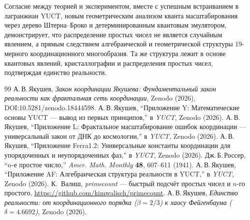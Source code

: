 \documentclass[12pt,a4paper]{article}
\begin{document}
	Согласие между теорией и экспериментом, вместе с успешным встраиванием в лагранжиан YUCT, новым геометрическим анализом кванта масштабирования через дерево Штерна–Броко и детерминированным квантовым эмулятором, демонстрирует, что распределение простых чисел не является случайным явлением, а прямым следствием алгебраической и геометрической структуры 19-мерного координационного многообразия. Та же структура лежит в основе квантовых явлений, кристаллографии и распределения простых чисел, подтверждая единство реальности.
	
	\begin{thebibliography}{99}
		А.\,В.\,Якушев, \emph{Закон координации Якушева: Фундаментальный закон реальности как фрактальная сеть координации}, Zenodo (2026), DOI:10.5281/zenodo.18444598.
		А.\,В.\,Якушев, ``Приложение Y: Математические основы YUCT — вывод из первых принципов,'' в \emph{YUCT}, Zenodo (2026).
		А.\,В.\,Якушев, ``Приложение L: Фрактальное масштабирование ошибок координации — универсальный закон от ДНК до космологии,'' в \emph{YUCT}, Zenodo (2026).
		А.\,В.\,Якушев, ``Приложение Ferra1.2: Универсальные константы координации для упорядоченных и неупорядоченных фаз,'' в \emph{YUCT}, Zenodo (2026).
		Дж.\,Б.\,Россер, ``$n$-е простое число,'' \emph{Amer. Math. Monthly} \textbf{48}, 607--611 (1941).
		А.\,В.\,Якушев, ``Приложение AF: Алгебраическая структура реальности в YUCT,'' в \emph{YUCT}, Zenodo (2026).
		К.~Валиш, \emph{primecount} — быстрый подсчёт простых чисел и $n$-го простого, \url{https://github.com/kimwalisch/primecount}.
		А.\,В.\,Якушев, \emph{Единство реальности: от координационного порядка ($\beta=2/3$) к хаосу Фейгенбаума ($\delta=4.6692$)}, Zenodo (2026).
	\end{thebibliography}
	
\end{document}
